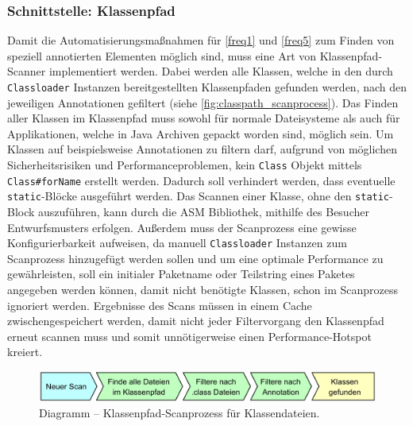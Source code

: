 \subsubsection{Schnittstelle: Klassenpfad}
\label{classpath_interface}
Damit die Automatisierungsmaßnahmen für \autoref{freq1} und \autoref{freq5} zum Finden von speziell annotierten Elementen möglich sind, muss eine Art von Klassenpfad-Scanner implementiert werden. Dabei werden alle Klassen, welche in den durch \texttt{Classloader} Instanzen bereitgestellten Klassenpfaden gefunden werden, nach den jeweiligen Annotationen gefiltert (siehe \autoref{fig:classpath_scanprocess}). Das Finden aller Klassen im Klassenpfad muss sowohl für normale Dateisysteme als auch für Applikationen, welche in Java Archiven gepackt worden sind, möglich sein. Um Klassen auf beispielsweise Annotationen zu filtern darf, aufgrund von möglichen Sicherheitsrisiken und Performanceproblemen, kein \texttt{Class} Objekt mittels \texttt{Class\#forName} erstellt werden. Dadurch soll verhindert werden, dass eventuelle \texttt{static}-Blöcke ausgeführt werden. Das Scannen einer Klasse, ohne den \texttt{static}-Block auszuführen, kann durch die ASM Bibliothek, mithilfe des Besucher Entwurfsmusters erfolgen. Außerdem muss der Scanprozess eine gewisse Konfigurierbarkeit aufweisen, da manuell \texttt{Classloader} Instanzen zum Scanprozess hinzugefügt werden sollen und um eine optimale Performance zu gewährleisten, soll ein initialer Paketname oder Teilstring eines Paketes angegeben werden können, damit nicht benötigte Klassen, schon im Scanprozess ignoriert werden. Ergebnisse des Scans müssen in einem Cache zwischengespeichert werden, damit nicht jeder Filtervorgang den Klassenpfad erneut scannen muss und somit unnötigerweise einen Performance-Hotspot kreiert.
\begin{figure}[H]
	\centering
	\includegraphics[width=\textwidth]{Abbildungen/Klassenpfad Scanprozess.png}
	\caption{Diagramm -- Klassenpfad-Scanprozess für Klassendateien.}
	\label{fig:classpath_scanprocess}
\end{figure}
